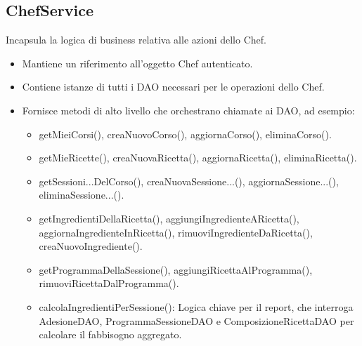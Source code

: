 \documentclass[a4paper, 12pt]{article}
\begin{document}
\subsection{ChefService}
Incapsula la logica di business relativa alle azioni dello Chef.
\begin{itemize}
    \item Mantiene un riferimento all'oggetto Chef autenticato.
    \item Contiene istanze di tutti i DAO necessari per le operazioni dello Chef.
    \item Fornisce metodi di alto livello che orchestrano chiamate ai DAO, ad esempio:
        \begin{itemize}
            \item getMieiCorsi(), creaNuovoCorso(), aggiornaCorso(), eliminaCorso().
            \item getMieRicette(), creaNuovaRicetta(), aggiornaRicetta(), eliminaRicetta().
            \item getSessioni...DelCorso(), creaNuovaSessione...(), aggiornaSessione...(), eliminaSessione...().
            \item getIngredientiDellaRicetta(), aggiungiIngredienteARicetta(), aggiornaIngredienteInRicetta(), rimuoviIngredienteDaRicetta(), creaNuovoIngrediente().
            \item getProgrammaDellaSessione(), aggiungiRicettaAlProgramma(), rimuoviRicettaDalProgramma().
            \item calcolaIngredientiPerSessione(): Logica chiave per il report, che interroga AdesioneDAO, ProgrammaSessioneDAO e ComposizioneRicettaDAO per calcolare il fabbisogno aggregato.
        \end{itemize}
\end{itemize}
\end{document}
